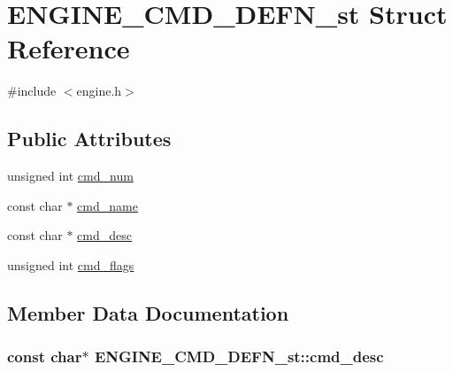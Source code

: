 \hypertarget{struct_e_n_g_i_n_e___c_m_d___d_e_f_n__st}{}\section{E\+N\+G\+I\+N\+E\+\_\+\+C\+M\+D\+\_\+\+D\+E\+F\+N\+\_\+st Struct Reference}
\label{struct_e_n_g_i_n_e___c_m_d___d_e_f_n__st}


{\ttfamily \#include $<$engine.\+h$>$}

\subsection*{Public Attributes}
\begin{DoxyCompactItemize}
\item 
unsigned int \hyperlink{struct_e_n_g_i_n_e___c_m_d___d_e_f_n__st_a4868776e2cc8f219c161072902b27761}{cmd\+\_\+num}
\item 
const char $\ast$ \hyperlink{struct_e_n_g_i_n_e___c_m_d___d_e_f_n__st_a852b7bb98dcb5c946e4574f33cbc40ac}{cmd\+\_\+name}
\item 
const char $\ast$ \hyperlink{struct_e_n_g_i_n_e___c_m_d___d_e_f_n__st_aeb668f4e30209755aa41b7fba3cd2895}{cmd\+\_\+desc}
\item 
unsigned int \hyperlink{struct_e_n_g_i_n_e___c_m_d___d_e_f_n__st_aa2dae056d36094415cdc11e6c7cac4a5}{cmd\+\_\+flags}
\end{DoxyCompactItemize}


\subsection{Member Data Documentation}
\subsubsection[{\texorpdfstring{cmd\+\_\+desc}{cmd_desc}}]{\setlength{\rightskip}{0pt plus 5cm}const char$\ast$ E\+N\+G\+I\+N\+E\+\_\+\+C\+M\+D\+\_\+\+D\+E\+F\+N\+\_\+st\+::cmd\+\_\+desc}\hypertarget{struct_e_n_g_i_n_e___c_m_d___d_e_f_n__st_aeb668f4e30209755aa41b7fba3cd2895}{}\label{struct_e_n_g_i_n_e___c_m_d___d_e_f_n__st_aeb668f4e30209755aa41b7fba3cd2895}
